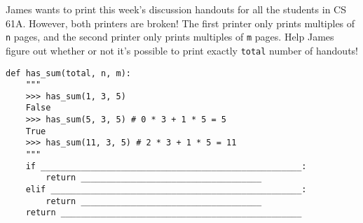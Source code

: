 \begin{blocksection}
\question James wants to print this week's discussion handouts for all the students in CS 61A.
However, both printers are broken! The first printer only prints multiples of \lstinline$n$
pages, and the second printer only prints multiples of \lstinline$m$ pages. Help James figure
out whether or not it's possible to print exactly \lstinline$total$ number of handouts!

\begin{lstlisting}
def has_sum(total, n, m):
    """
    >>> has_sum(1, 3, 5)
    False
    >>> has_sum(5, 3, 5) # 0 * 3 + 1 * 5 = 5
    True
    >>> has_sum(11, 3, 5) # 2 * 3 + 1 * 5 = 11
    """
    if ____________________________________________________:
        return ____________________________________
    elif __________________________________________________:
        return ____________________________________
    return ________________________________________________
    
\end{lstlisting}

\end{blocksection}
